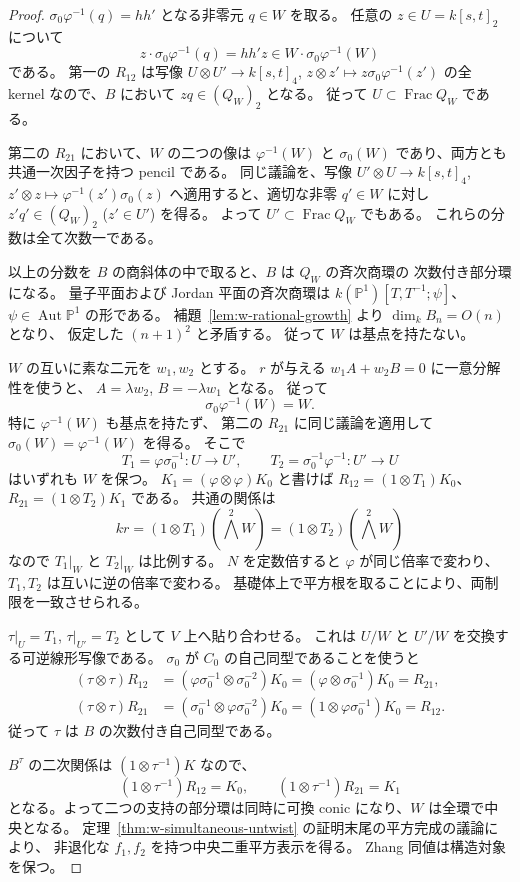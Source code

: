 \begin{proof}
$\sigma_0\varphi^{-1}(q)=hh'$ となる非零元 $q\in W$ を取る。
任意の $z\in U=k[s,t]_2$ について
\[
 z\cdot\sigma_0\varphi^{-1}(q)=hh'z
 \in W\cdot\sigma_0\varphi^{-1}(W)
\]
である。
第一の $R_{12}$ は写像
$U\otimes U'\to k[s,t]_4$, $z\otimes z'\mapsto z\sigma_0\varphi^{-1}(z')$
の全 kernel なので、$B$ において $zq\in(Q_W)_2$ となる。
従って $U\subset\operatorname{Frac}Q_W$ である。

第二の $R_{21}$ において、$W$ の二つの像は
$\varphi^{-1}(W)$ と $\sigma_0(W)$ であり、両方とも共通一次因子を持つ pencil である。
同じ議論を、写像
$U'\otimes U\to k[s,t]_4$, $z'\otimes z\mapsto\varphi^{-1}(z')\sigma_0(z)$
へ適用すると、適切な非零 $q'\in W$ に対し
$z'q'\in(Q_W)_2$ ($z'\in U'$) を得る。
よって $U'\subset\operatorname{Frac}Q_W$ でもある。
これらの分数は全て次数一である。

以上の分数を $B$ の商斜体の中で取ると、$B$ は $Q_W$ の斉次商環の
次数付き部分環になる。
量子平面および Jordan 平面の斉次商環は
$k(\mathbb P^1)[T,T^{-1};\psi]$、$\psi\in\operatorname{Aut}\mathbb P^1$
の形である。
補題~\ref{lem:w-rational-growth} より $\dim_kB_n=O(n)$ となり、
仮定した $(n+1)^2$ と矛盾する。
従って $W$ は基点を持たない。

$W$ の互いに素な二元を $w_1,w_2$ とする。
$r$ が与える $w_1A+w_2B=0$ に一意分解性を使うと、
$A=\lambda w_2$, $B=-\lambda w_1$ となる。
従って
\[
 \sigma_0\varphi^{-1}(W)=W.
\]
特に $\varphi^{-1}(W)$ も基点を持たず、
第二の $R_{21}$ に同じ議論を適用して
$\sigma_0(W)=\varphi^{-1}(W)$ を得る。
そこで
\[
 T_1=\varphi\sigma_0^{-1}:U\longrightarrow U',\qquad
 T_2=\sigma_0^{-1}\varphi^{-1}:U'\longrightarrow U
\]
はいずれも $W$ を保つ。
$K_1=(\varphi\otimes\varphi)K_0$ と書けば
$R_{12}=(1\otimes T_1)K_0$、$R_{21}=(1\otimes T_2)K_1$ である。
共通の関係は
\[
 kr=(1\otimes T_1)(\bigwedge^2W)
    =(1\otimes T_2)(\bigwedge^2W)
\]
なので $T_1|_W$ と $T_2|_W$ は比例する。
$N$ を定数倍すると $\varphi$ が同じ倍率で変わり、
$T_1,T_2$ は互いに逆の倍率で変わる。
基礎体上で平方根を取ることにより、両制限を一致させられる。

$\tau|_U=T_1$, $\tau|_{U'}=T_2$ として $V$ 上へ貼り合わせる。
これは $U/W$ と $U'/W$ を交換する可逆線形写像である。
$\sigma_0$ が $C_0$ の自己同型であることを使うと
\begin{align*}
 (\tau\otimes\tau)R_{12}
  &=(\varphi\sigma_0^{-1}\otimes\sigma_0^{-2})K_0
    =(\varphi\otimes\sigma_0^{-1})K_0=R_{21},\\
 (\tau\otimes\tau)R_{21}
  &=(\sigma_0^{-1}\otimes\varphi\sigma_0^{-2})K_0
    =(1\otimes\varphi\sigma_0^{-1})K_0=R_{12}.
\end{align*}
従って $\tau$ は $B$ の次数付き自己同型である。

$B^\tau$ の二次関係は $(1\otimes\tau^{-1})K$ なので、
\[
 (1\otimes\tau^{-1})R_{12}=K_0,\qquad
 (1\otimes\tau^{-1})R_{21}=K_1
\]
となる。よって二つの支持の部分環は同時に可換 conic になり、$W$ は全環で中央となる。
定理~\ref{thm:w-simultaneous-untwist} の証明末尾の平方完成の議論により、
非退化な $f_1,f_2$ を持つ中央二重平方表示を得る。
Zhang 同値は構造対象を保つ。
\end{proof}

